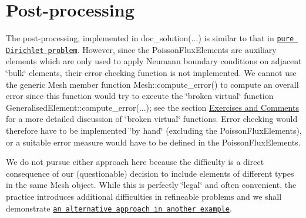 \hypertarget{index_doc}{}\section{Post-\/processing}\label{index_doc}
The post-\/processing, implemented in {\ttfamily doc\+\_\+solution}(...) is similar to that in \href{../../../poisson/two_d_poisson/html/index.html}{\tt pure Dirichlet problem}. However, since the {\ttfamily Poisson\+Flux\+Elements} are auxiliary elements which are only used to apply Neumann boundary conditions on adjacent \char`\"{}bulk\char`\"{} elements, their error checking function is not implemented. We cannot use the generic {\ttfamily Mesh} member function {\ttfamily Mesh\+::compute\+\_\+error()} to compute an overall error since this function would try to execute the \char`\"{}broken virtual\char`\"{} function {\ttfamily Generalised\+Element\+::compute\+\_\+error}(...); see the section \hyperlink{index_exercises}{Exercises and Comments} for a more detailed discussion of \char`\"{}broken virtual\char`\"{} functions. Error checking would therefore have to be implemented \char`\"{}by hand\char`\"{} (excluding the {\ttfamily Poisson\+Flux\+Elements}), or a suitable error measure would have to be defined in the {\ttfamily Poisson\+Flux\+Elements}.

We do not pursue either approach here because the difficulty is a direct consequence of our (questionable) decision to include elements of different types in the same {\ttfamily Mesh} object. While this is perfectly \char`\"{}legal\char`\"{} and often convenient, the practice introduces additional difficulties in refineable problems and we shall demonstrate \href{../../../poisson/two_d_poisson_flux_bc2/html/index.html}{\tt an alternative approach in another example}.


